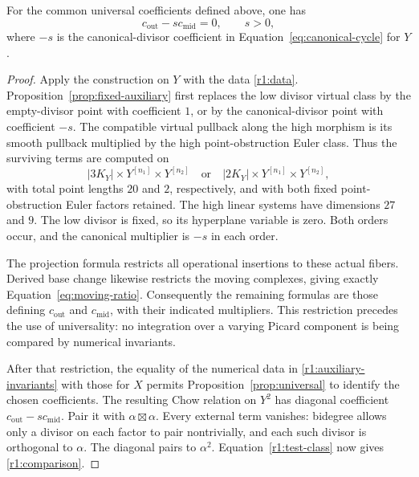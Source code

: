 \begin{lemma}\label{r1:auxiliary-comparison}
For the common universal coefficients defined above, one has
\begin{equation}\label{r1:comparison}
 c_{\mathrm{out}}-s c_{\mathrm{mid}}=0,
 \qquad s>0,
\end{equation}
where $-s$ is the canonical-divisor coefficient in
Equation~\eqref{eq:canonical-cycle} for $Y$.
\end{lemma}

\begin{proof}
Apply the construction on $Y$ with the data \eqref{r1:data}.
Proposition~\ref{prop:fixed-auxiliary} first replaces the low divisor
virtual class by the empty-divisor point with coefficient $1$, or by
the canonical-divisor point with coefficient $-s$. The compatible virtual
pullback along the high morphism is its smooth pullback multiplied by
the high point-obstruction Euler class. Thus the surviving terms are computed on
\[
 |3K_Y|\times Y^{[n_1]}\times Y^{[n_2]}
 \quad\text{or}\quad
 |2K_Y|\times Y^{[n_1]}\times Y^{[n_2]},
\]
with total point lengths $20$ and $2$, respectively, and with both fixed
point-obstruction Euler factors retained. The high linear systems have
dimensions $27$ and $9$. The low divisor is fixed, so its hyperplane
variable is zero. Both orders occur, and the canonical multiplier is
$-s$ in each order.

The projection formula restricts all operational insertions to these
actual fibers. Derived base change likewise restricts the moving
complexes, giving exactly Equation~\eqref{eq:moving-ratio}.
Consequently the remaining formulas are those defining
$c_{\mathrm{out}}$ and $c_{\mathrm{mid}}$, with their indicated
multipliers. This restriction precedes the use of universality: no
integration over a varying Picard component is being compared by
numerical invariants.

After that restriction, the equality of the numerical data in
\eqref{r1:auxiliary-invariants} with those for $X$ permits
Proposition~\ref{prop:universal} to identify the chosen coefficients.
The resulting Chow relation on $Y^2$ has diagonal coefficient
$c_{\mathrm{out}}-s c_{\mathrm{mid}}$.  Pair it with
$\alpha\boxtimes\alpha$.  Every external term vanishes: bidegree
allows only a divisor on each factor to pair nontrivially, and each
such divisor is orthogonal to $\alpha$.  The diagonal pairs to
$\alpha^2$.  Equation~\eqref{r1:test-class} now gives
\eqref{r1:comparison}.
\end{proof}

